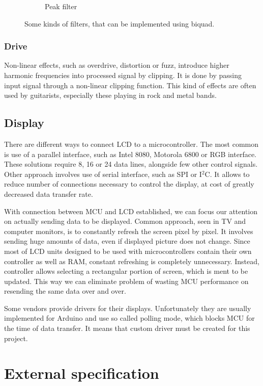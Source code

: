 \documentclass[a4paper,twoside,12pt]{book}
\begin{document}
\begin{figure}[H]
\begin{subfigure}[t]{0.25\textwidth}
        \label{fig:peak}
        \caption{Peak filter}
    \end{subfigure}
    \caption{Some kinds of filters, that can be implemented using biquad.}
    \label{fig:biquad}
\end{figure}

\subsection{Drive}
Non-linear effects, such as overdrive, distortion or fuzz,
introduce higher harmonic frequencies into processed signal by clipping.
It is done by passing input signal through a non-linear clipping function.
This kind of effects are often used by guitarists,
especially these playing in rock and metal bands.

\section{Display}
There are different ways to connect LCD to a microcontroller.
The most common is use of a parallel interface,
such as Intel 8080, Motorola 6800 or RGB interface.
These solutions require 8, 16 or 24 data lines,
alongside few other control signals.
Other approach involves use of serial interface,
such as SPI or I\(^2\)C.
It allows to reduce number of connections necessary to control the display,
at cost of greatly decreased data transfer rate.

With connection between MCU and LCD established,
we can focus our attention on actually sending data to be displayed.
Common approach, seen in TV and computer monitors,
is to constantly refresh the screen pixel by pixel.
It involves sending huge amounts of data,
even if displayed picture does not change.
Since most of LCD units designed to be used with microcontrollers
contain their own controller as well as RAM,
constant refreshing is completely unnecessary.
Instead, controller allows selecting a rectangular portion
of screen, which is ment to be updated.
This way we can eliminate problem of wasting MCU performance
on resending the same data over and over.

Some vendors provide drivers for their displays.
Unfortunately they are usually implemented for Arduino
and use so called polling mode,
which blocks MCU for the time of data transfer.
It means that custom driver must be created for this project.


\chapter{External specification}
\end{document}
